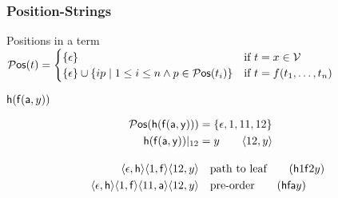 
\begin{frame}
\frametitle{Position-Strings}
\begin{exampleblock}{Positions in a term}
$
	{}{\mathcal P}\mathsf{os}(t) =  
	\begin{cases}
		\{ \epsilon \} & \text{if }t=x\in{\mathcal V} \\
		\{ \epsilon \} \cup \{ ip\mid 1\leq i\leq n \land p\in{}{\mathcal P}\mathsf{os}(t_i)\} &
		\text{if }t=f(t_1,\ldots,t_n)
	\end{cases}
$
\end{exampleblock}

%

\begin{exampleblock}{${\mathsf h}({\mathsf f}({\mathsf a},y))$}
\begin{minipage}[c]{3.1cm}
\end{minipage}
%
\begin{minipage}[c]{8.5cm}
\begin{align*}
\Pos(\mh(\mf(\ma,\my))) &= \{ \epsilon, 1, 11, 12 \}
\\
\mh(\mf(\ma,\my))|_{12} &= y \tag*{$\ANGLES{12,y}$}
\\[1em]
\ANGLES{\epsilon,\mh}\ANGLES{1,\mf}\ANGLES{12,y}
&\quad 
\text{path to leaf} 
\tag{$\mh 1 \mf 2 y$}
\\
\ANGLES{\epsilon,\mh}\ANGLES{1,\mf}\ANGLES{11,\ma}\ANGLES{12,y}
&\quad
\text{pre-order} 
\tag{$\mh \mf \ma y$}
\\
\end{align*}
%
\end{minipage}
\end{exampleblock}
\end{frame}
